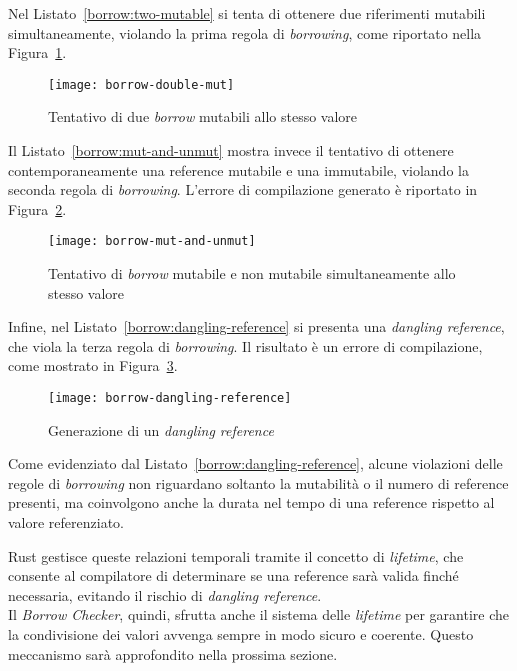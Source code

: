 \noindent Nel Listato~\ref{borrow:two-mutable} si tenta di ottenere due riferimenti mutabili simultaneamente, violando la prima regola di \textit{borrowing}, come riportato nella 
Figura~\ref{borrow:double-mut-compile}.
\begin{figure}[htbp]
    \begin{center}
        \texttt{[image: borrow-double-mut]}
        \caption{Tentativo di due \textit{borrow} mutabili allo stesso valore}\label{borrow:double-mut-compile}
    \end{center}
\end{figure}
Il Listato~\ref{borrow:mut-and-unmut} mostra invece il tentativo di ottenere contemporaneamente una reference mutabile e una immutabile, violando la seconda regola di \textit{borrowing}. 
L'errore di compilazione generato è riportato in Figura~\ref{borrow:mut-and-unmut-compile}.
\begin{figure}[htbp]
    \begin{center}
        \texttt{[image: borrow-mut-and-unmut]}
        \caption{Tentativo di \textit{borrow} mutabile e non mutabile simultaneamente allo stesso valore}\label{borrow:mut-and-unmut-compile}
    \end{center}
\end{figure}
Infine, nel Listato~\ref{borrow:dangling-reference} si presenta una \textit{dangling reference}, che viola la terza regola di \textit{borrowing}.
Il risultato è un errore di compilazione, come mostrato in Figura~\ref{borrow:dangling-reference-compile}.
\begin{figure}[htbp]
    \begin{center}
        \texttt{[image: borrow-dangling-reference]}
        \caption{Generazione di un \textit{dangling reference}}\label{borrow:dangling-reference-compile}
    \end{center}
\end{figure}
\vspace{5pt}
Come evidenziato dal Listato~\ref{borrow:dangling-reference}, alcune violazioni delle regole di \textit{borrowing} non riguardano soltanto la mutabilità o il numero di reference presenti, ma coinvolgono anche la durata nel tempo di una reference rispetto al valore referenziato.

Rust gestisce queste relazioni temporali tramite il concetto di \textit{lifetime}, che consente al compilatore di determinare se una reference sarà valida finché necessaria, evitando il rischio di \textit{dangling reference}. \hfill
\vspace{10pt}\\
\noindent Il \textit{Borrow Checker}, quindi, sfrutta anche il sistema delle \textit{lifetime} per garantire che la condivisione dei valori avvenga sempre in modo sicuro e coerente. Questo meccanismo sarà approfondito nella prossima sezione.

